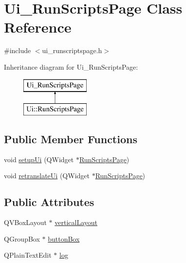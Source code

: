 \hypertarget{class_ui___run_scripts_page}{}\section{Ui\+\_\+\+Run\+Scripts\+Page Class Reference}
\label{class_ui___run_scripts_page}


{\ttfamily \#include $<$ui\+\_\+runscriptspage.\+h$>$}

Inheritance diagram for Ui\+\_\+\+Run\+Scripts\+Page\+:\begin{figure}[H]
\begin{center}
\leavevmode
\includegraphics[height=2.000000cm]{da/ded/class_ui___run_scripts_page}
\end{center}
\end{figure}
\subsection*{Public Member Functions}
\begin{DoxyCompactItemize}
\item 
void \mbox{\hyperlink{class_ui___run_scripts_page_a2416883abc2ebcc5e6b019315ef23697}{setup\+Ui}} (Q\+Widget $\ast$\mbox{\hyperlink{class_run_scripts_page}{Run\+Scripts\+Page}})
\item 
void \mbox{\hyperlink{class_ui___run_scripts_page_a7892985e775ca31c5f3fc6a77bd533ec}{retranslate\+Ui}} (Q\+Widget $\ast$\mbox{\hyperlink{class_run_scripts_page}{Run\+Scripts\+Page}})
\end{DoxyCompactItemize}
\subsection*{Public Attributes}
\begin{DoxyCompactItemize}
\item 
Q\+V\+Box\+Layout $\ast$ \mbox{\hyperlink{class_ui___run_scripts_page_a433553759077c25cddb9e13fa16671b9}{vertical\+Layout}}
\item 
Q\+Group\+Box $\ast$ \mbox{\hyperlink{class_ui___run_scripts_page_a1981da603b8b6495ec7ef2d2c9ef9b12}{button\+Box}}
\item 
Q\+Plain\+Text\+Edit $\ast$ \mbox{\hyperlink{class_ui___run_scripts_page_a150bdfd9bff55c40e653b883f9317d7b}{log}}
\end{DoxyCompactItemize}


